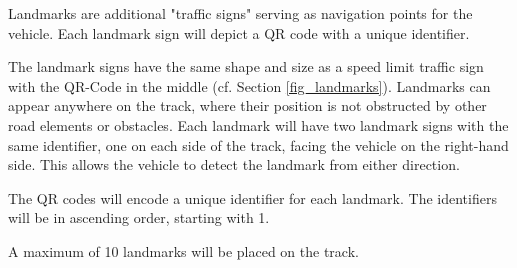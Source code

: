 Landmarks are additional "traffic signs" serving as navigation points for the vehicle.
Each landmark sign will depict a QR code with a unique identifier.

The landmark signs have the same shape and size as a speed limit traffic sign with the QR-Code in the middle (cf. Section \ref{fig_landmarks}).
Landmarks can appear anywhere on the track, where their position is not obstructed by other road elements or obstacles.
Each landmark will have two landmark signs with the same identifier, one on each side of the track, facing the vehicle on the right-hand side.
This allows the vehicle to detect the landmark from either direction.

The QR codes will encode a unique identifier for each landmark.
The identifiers will be in ascending order, starting with 1.

A maximum of 10 landmarks will be placed on the track.
